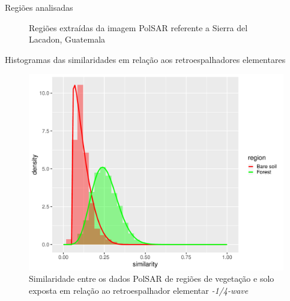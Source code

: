 \documentclass{beamer} %
\begin{document}
\begin{frame}{Regiões analisadas}
      \begin{figure}%
        \centering
        \qquad
        \caption{Regiões extraídas da imagem PolSAR referente a Sierra del Lacadon, Guatemala}%
        \label{fig:regions}%
    \end{figure}
\end{frame}

\begin{frame}{Histogramas das similaridades em relação aos retroespalhadores elementares}

\begin{figure}
    \centering
    \includegraphics[width = .6\linewidth]{wvn.pdf}
    \caption{Similaridade entre os dados PolSAR de regiões de vegetação e solo exposta em relação ao retroespalhador elementar \textit{-1/4-wave}}
    \label{fig:wvn}
\end{figure}
    
\end{frame}
\end{document}
